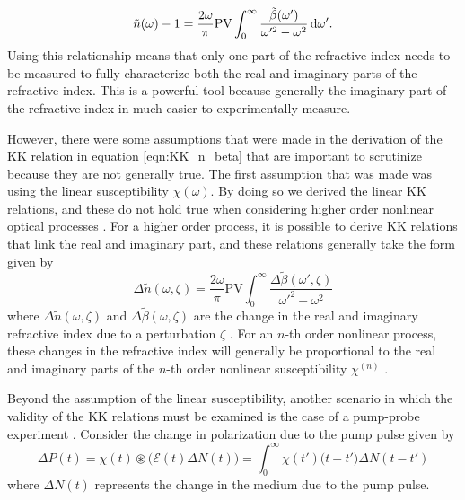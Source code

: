 \begin{equation}
	\label{eqn:KK_n_beta}
	\tilde{n}(\omega) - 1 = \frac{2\omega}{\pi}\mathrm{PV}\int_{0}^{\infty} \frac{\tilde{\beta}(\omega')}{\omega'^2 - \omega^2} \mathop{}\!\mathrm{d} \omega'.
\end{equation}
Using this relationship means that only one part of the refractive index needs to be measured to fully characterize both the real and imaginary parts of the refractive index.  This is a powerful tool because generally the imaginary part of the refractive index in much easier to experimentally measure.

However, there were some assumptions that were made in the derivation of the KK relation in equation \ref{eqn:KK_n_beta} that are important to scrutinize because they are not generally true.  The first assumption that was made was using the linear susceptibility $\chi(\omega)$.  By doing so we derived the linear KK relations, and these do not hold true when considering higher order nonlinear optical processes \cite{lucariniKramersKronigRelationsOptical2005, hutchingsKramersKronigRelationsNonlinear1992}.  For a higher order process, it is possible to derive KK relations that link the real and imaginary part, and these relations generally take the form given by
\begin{equation}
	\label{eqn:dn_db_KK}
	\Delta\tilde{n}(\omega, \zeta) = \frac{2\omega}{\pi} \mathrm{PV}\int_{0}^{\infty} \frac{\Delta\tilde{\beta}(\omega',\zeta)}{\omega'^2 - \omega^2} 
\end{equation}  
where $\Delta\tilde{n}(\omega, \zeta)$ and $\Delta\tilde{\beta}(\omega,\zeta)$ are the change in the real and imaginary refractive index due to a perturbation $\zeta$ \cite{hutchingsKramersKronigRelationsNonlinear1992, lucariniKramersKronigRelationsOptical2005}.  For an $n$-th order nonlinear process, these changes in the refractive index will generally be proportional to the real and imaginary parts of the $n$-th order nonlinear susceptibility $\chi^{(n)}$ \cite{boydNonlinearOptics2008, lucariniKramersKronigRelationsOptical2005, hutchingsKramersKronigRelationsNonlinear1992}.

Beyond the assumption of the linear susceptibility, another scenario in which the validity of the KK relations must be examined is the case of a pump-probe experiment \cite{tokunagaFemtosecondTimeresolvedDispersion1993, tokunagaFemtosecondContinuumInterferometer1996, lucariniKramersKronigRelationsOptical2005}.  Consider the change in polarization due to the pump pulse given by
\begin{equation}
	\Delta P(t) = \chi(t)\circledast \big( \mathcal{E}(t) \Delta N(t)\big) = \int_{0}^{\infty}\chi(t')\mathcal(t-t')\Delta N(t-t')
\end{equation}
where $\Delta N (t)$ represents the change in the medium due to the pump pulse.
